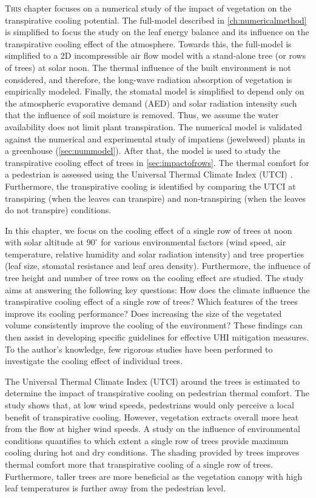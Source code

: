 \lettrine[lines=3,nindent=0em,loversize=0.1]{T}{his} chapter focuses on a numerical study of the impact of vegetation on the transpirative cooling potential. The full-model described in \cref{ch:numericalmethod} is simplified to focus the study on the leaf energy balance and its influence on the transpirative cooling effect of the atmosphere. Towards this, the full-model is simplified to a 2D incompressible air flow model with a stand-alone tree (or rows of trees) at solar noon. The thermal influence of the built environment is not considered, and therefore, the long-wave radiation absorption of vegetation is empirically modeled. Finally, the stomatal model is simplified to depend only on the atmospheric evaporative demand (AED) and solar radiation intensity such that the influence of soil moisture is removed. Thus, we assume the water availability does not limit plant transpiration. The numerical model is validated against the numerical and experimental study of impatiens (jewelweed) plants in a greenhouse (\cref{sec:nummodel}). After that, the model is used to study the transpirative cooling effect of trees in \cref{sec:impactofrows}. The thermal comfort for a pedestrian is assessed using the Universal Thermal Climate Index (UTCI) \citep{Fiala2001}. Furthermore, the transpirative cooling is identified by comparing the UTCI at transpiring (when the leaves can transpire) and non-transpiring (when the leaves do not transpire) conditions.

In this chapter, we focus on the cooling effect of a single row of trees at noon with solar altitude at $90^{\circ}$ for various environmental factors (wind speed, air temperature, relative humidity and solar radiation intensity) and tree properties (leaf size, stomatal resistance and leaf area density). Furthermore, the influence of tree height and number of tree rows on the cooling effect are studied. The study aims at answering the following key questions: How does the climate influence the transpirative cooling effect of a single row of trees? Which features of the trees improve its cooling performance? Does increasing the size of the vegetated volume consistently improve the cooling of the environment? These findings can then assist in developing specific guidelines for effective UHI mitigation measures. To the author’s knowledge, few rigorous studies have been performed to investigate the cooling effect of individual trees. 

The Universal Thermal Climate Index (UTCI) around the trees is estimated to determine the impact of transpirative cooling on pedestrian thermal comfort. The study shows that, at low wind speeds, pedestrians would only perceive a local benefit of transpirative cooling. However, vegetation extracts overall more heat from the flow at higher wind speeds. A study on the influence of environmental conditions quantifies to which extent a single row of trees provide maximum cooling during hot and dry conditions. The shading provided by trees improves thermal comfort more that transpirative cooling of a single row of trees. Furthermore, taller trees are more beneficial as the vegetation canopy with high leaf temperatures is further away from the pedestrian level.

